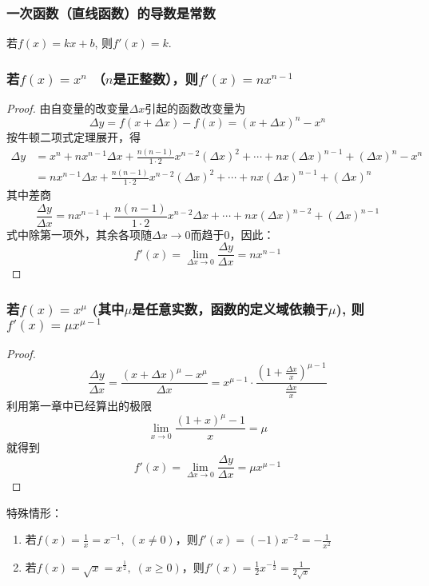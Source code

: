 \subsubsection{一次函数（直线函数）的导数是常数}

若$f(x)=kx+b$, 则$f'(x)=k$. 

\subsubsection{若$f(x)=x^n$ （$n$是正整数），则$f'(x)=nx^{n-1}$}

\begin{proof}
  由自变量的改变量$\Delta x$引起的函数改变量为
\[\Delta y=f (x+\Delta x) -f (x) = (x+\Delta x)^n-x^n\] 
按牛顿二项式定理展开，得  
\[\begin{split}
\Delta y&= x^n+nx^{n-1}\Delta x+\frac{n(n-1)}{1\cdot 2}x^{n-2}(\Delta x)^2+\cdots+nx(\Delta x)^{n-1}+(\Delta x)^n-x^n\\
&=nx^{n-1}\Delta x+\frac{n(n-1)}{1\cdot 2}x^{n-2}(\Delta x)^2+\cdots+nx(\Delta x)^{n-1}+(\Delta x)^n
\end{split}\]
其中差商
\[\frac{\Delta y}{\Delta x}=nx^{n-1}+\frac{n(n-1)}{1\cdot 2}x^{n-2}\Delta x+\cdots+nx(\Delta x)^{n-2}+(\Delta x)^{n-1}\]
式中除第一项外，其余各项随$\Delta x\to 0$而趋于0，因此：
\[f'(x)=\lim_{\Delta x\to 0}\frac{\Delta y}{\Delta x}=nx^{n-1}\]
\end{proof}

\subsubsection{若$f(x)=x^{\mu}$ (其中$\mu$是任意实数，函数的定义域依赖于$\mu$), 则$f'(x)=\mu x^{\mu-1}$}

\begin{proof}
    \[\frac{\Delta y}{\Delta x}=\frac{(x+\Delta x)^{\mu}-x^{\mu}}{\Delta x}=x^{\mu-1}\cdot \frac{\left(1+\frac{\Delta x}{x}\right)^{\mu-1}}{\frac{\Delta x}{x}}\]
利用第一章中已经算出的极限
\[\lim_{x\to 0}\frac{(1+x)^{\mu}-1}{x}=\mu\]
就得到
\[f'(x)=\lim_{\Delta x\to 0}\frac{\Delta y}{\Delta x}=\mu x^{\mu-1}\]
\end{proof}

特殊情形：
\begin{enumerate}
    \item 若$f(x)=\frac{1}{x}=x^{-1},\; (x\ne 0)$，则$f'(x)=(-1)x^{-2}=-\frac{1}{x^2}$
    \item 若$f(x)=\sqrt{x}=x^{\tfrac{1}{2}},\; (x\ge 0)$，则$f'(x)=\frac{1}{2}x^{-\tfrac{1}{2}}=\frac{1}{2\sqrt{x}}$
\end{enumerate}

